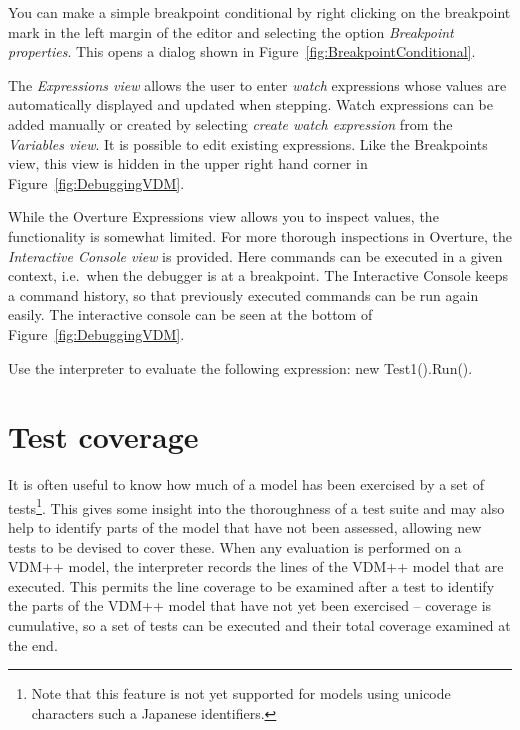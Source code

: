 You can make a simple breakpoint conditional by right clicking on the
breakpoint mark in the left margin of the editor and selecting the
option \emph{Breakpoint properties}. This opens a dialog shown in
Figure~\ref{fig:BreakpointConditional}.

The \emph{Expressions view} allows the user to enter \emph{watch}
expressions whose values are automatically displayed and updated when
stepping. Watch expressions can be added manually or created by
selecting \emph{create watch expression} from the \emph{Variables view}. It
is possible to edit existing expressions.  Like the Breakpoints view,
this view is hidden in the upper right hand corner in
Figure~\ref{fig:DebuggingVDM}.

While the Overture Expressions view allows you to inspect values, the
functionality is somewhat limited. For more thorough inspections in
Overture, the \emph{Interactive Console view} is provided. Here
commands can be executed in a given context, i.e.\ when the debugger
is at a breakpoint. The Interactive Console keeps a command history,
so that previously executed commands can be run again easily. The
interactive console can be seen at the bottom of
Figure~\ref{fig:DebuggingVDM}.


\begin{myexercise}
\label{ex:tool-monitor}Use the interpreter to evaluate the
  following expression: {\ttfamily new Test1().Run()}.
\end{myexercise}



\section{Test coverage}\label{sec:testcov}

It is often useful to know how much of a model has been exercised by a
set of tests\footnote{Note that this feature is not yet supported for
  models using unicode characters such a Japanese identifiers.}. 
This gives some insight into the thoroughness of a test
suite and may also help to identify parts of the model that have not
been assessed, allowing new tests to be devised to cover these. When
any evaluation is performed on a VDM++ model, the interpreter records
the lines of the VDM++ model that are executed. This permits the line
coverage to be examined after a test to identify the parts of the
VDM++ model that have not yet been exercised -- coverage is
cumulative, so a set of tests can be executed and their total coverage
examined at the end.

